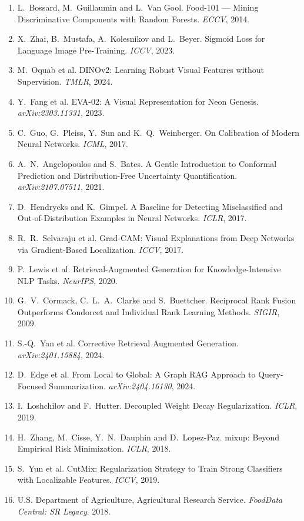 \documentclass[12pt,a4paper,oneside]{report}
\begin{document}
\begin{enumerate}[leftmargin=*, itemsep=4pt]
  \item L.~Bossard, M.~Guillaumin and L.~Van Gool. Food-101 --- Mining
  Discriminative Components with Random Forests. \emph{ECCV}, 2014.
  \item X.~Zhai, B.~Mustafa, A.~Kolesnikov and L.~Beyer. Sigmoid Loss for
  Language Image Pre-Training. \emph{ICCV}, 2023.
  \item M.~Oquab et al. DINOv2: Learning Robust Visual Features without
  Supervision. \emph{TMLR}, 2024.
  \item Y.~Fang et al. EVA-02: A Visual Representation for Neon Genesis.
  \emph{arXiv:2303.11331}, 2023.
  \item C.~Guo, G.~Pleiss, Y.~Sun and K.~Q.~Weinberger. On Calibration of Modern
  Neural Networks. \emph{ICML}, 2017.
  \item A.~N.~Angelopoulos and S.~Bates. A Gentle Introduction to Conformal
  Prediction and Distribution-Free Uncertainty Quantification.
  \emph{arXiv:2107.07511}, 2021.
  \item D.~Hendrycks and K.~Gimpel. A Baseline for Detecting Misclassified and
  Out-of-Distribution Examples in Neural Networks. \emph{ICLR}, 2017.
  \item R.~R.~Selvaraju et al. Grad-CAM: Visual Explanations from Deep Networks
  via Gradient-Based Localization. \emph{ICCV}, 2017.
  \item P.~Lewis et al. Retrieval-Augmented Generation for Knowledge-Intensive
  NLP Tasks. \emph{NeurIPS}, 2020.
  \item G.~V.~Cormack, C.~L.~A.~Clarke and S.~Buettcher. Reciprocal Rank Fusion
  Outperforms Condorcet and Individual Rank Learning Methods. \emph{SIGIR}, 2009.
  \item S.-Q.~Yan et al. Corrective Retrieval Augmented Generation.
  \emph{arXiv:2401.15884}, 2024.
  \item D.~Edge et al. From Local to Global: A Graph RAG Approach to
  Query-Focused Summarization. \emph{arXiv:2404.16130}, 2024.
  \item I.~Loshchilov and F.~Hutter. Decoupled Weight Decay Regularization.
  \emph{ICLR}, 2019.
  \item H.~Zhang, M.~Cisse, Y.~N.~Dauphin and D.~Lopez-Paz. mixup: Beyond
  Empirical Risk Minimization. \emph{ICLR}, 2018.
  \item S.~Yun et al. CutMix: Regularization Strategy to Train Strong
  Classifiers with Localizable Features. \emph{ICCV}, 2019.
  \item U.S. Department of Agriculture, Agricultural Research Service.
  \emph{FoodData Central: SR Legacy}. 2018.
\end{enumerate}
\end{document}
